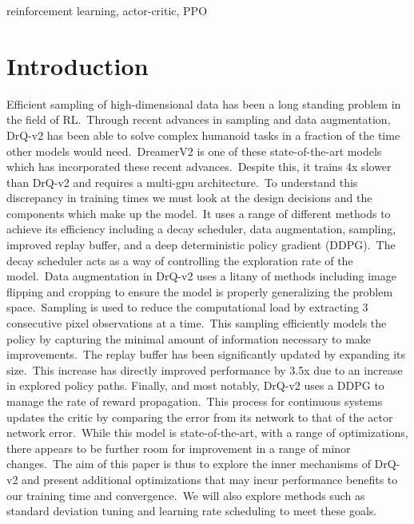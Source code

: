 \documentclass[conference]{./IEEEtran/IEEEtran} %
\begin{document}
    \begin{IEEEkeywords}
        reinforcement learning, actor-critic, PPO
    \end{IEEEkeywords}

    \section{Introduction}\label{sec:introduction}


    Efficient sampling of high-dimensional data has been a long standing problem in the field of RL.\ Through recent advances in
    sampling and data augmentation, DrQ-v2 has been able to solve complex humanoid tasks in a fraction of the time other models
    would need.\ DreamerV2 \cite{DreamerV2} is one of these state-of-the-art models which has incorporated these recent advances.\
    Despite this, it trains 4x slower than DrQ-v2 and requires a multi-gpu architecture.\ To understand this discrepancy in training
    times we must look at the design decisions and the components which make up the model.\ It uses a range of different methods
    to achieve its efficiency including a decay scheduler, data augmentation, sampling, improved replay buffer, and a deep
    deterministic policy gradient (DDPG).\
    The decay scheduler acts as a way of controlling the exploration rate of the model.\ Data augmentation in DrQ-v2 uses a litany
    of methods including image flipping and cropping to ensure the model is properly generalizing the problem space.\ Sampling is
    used to reduce the computational load by extracting 3 consecutive pixel observations at a time.\ This sampling efficiently
    models the policy by capturing the minimal amount of information necessary to make improvements.\ The replay buffer has been
    significantly updated  by expanding its size.\ This increase has directly improved performance by 3.5x due to an increase in
    explored policy paths. Finally, and most notably, DrQ-v2 uses a DDPG to manage the rate of reward propagation.\ This process
    for continuous systems  updates the critic by comparing the error from its network to that of the actor network error.\
    While this model is state-of-the-art, with a range of optimizations, there appears to be further room for improvement in a
    range of minor changes.\ The aim of this paper is thus to explore the inner mechanisms of DrQ-v2 and present additional
    optimizations that may incur performance benefits to our training time and convergence.\ We will also explore methods such
    as standard deviation tuning and learning rate scheduling to meet these goals.\
\end{document}
